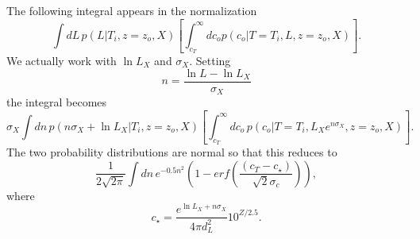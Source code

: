 \documentclass[preprint,3p]{elsarticle}
\begin{document}
The following integral appears in the normalization
\begin{equation}
\int dL\, p(L|T_i, z=z_o, X)  \left[\int_{c_T}^{\infty} dc_o  p(c_o | T=T_i, L, z=z_o, X)\right].
\end{equation}
We actually work with $\ln{L_X}$ and $\sigma_X$.  Setting
\begin{equation}
n=\frac{\ln{L}-\ln{L_X}}{\sigma_X}
\end{equation}
the integral becomes
 \begin{equation}
\sigma_X \int dn\, p(n\sigma_X + \ln{L_X} |T_i, z=z_o, X)  \left[\int_{c_T}^{\infty} dc_o\,  p(c_o | T=T_i, L_Xe^{n\sigma_X}, z=z_o, X)\right].
\end{equation}
The two probability distributions are normal so that this reduces to
 \begin{equation}
\frac{1}{2\sqrt{2\pi}} \int dn\, e^{-0.5n^2} \left(1-erf\left(\frac{(c_T - c_\star)}{\sqrt{2}\sigma_c}\right)\right),
\end{equation}
where
\begin{equation}
c_\star = \frac{e^{\ln{L_X}+n\sigma_X}}{4\pi d_L^2}10^{Z/2.5}.
\end{equation}
\end{document}
